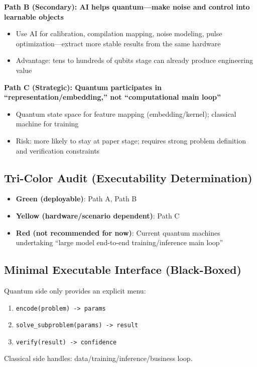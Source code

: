 \documentclass[conference]{IEEEtran}
\theoremstyle{remark}
\begin{document}
\textbf{Path B (Secondary): AI helps quantum---make noise and control into learnable objects}
\begin{itemize}[nosep]
\item Use AI for calibration, compilation mapping, noise modeling, pulse optimization---extract more stable results from the same hardware
\item Advantage: tens to hundreds of qubits stage can already produce engineering value
\end{itemize}

\textbf{Path C (Strategic): Quantum participates in ``representation/embedding,'' not ``computational main loop''}
\begin{itemize}[nosep]
\item Quantum state space for feature mapping (embedding/kernel); classical machine for training
\item Risk: more likely to stay at paper stage; requires strong problem definition and verification constraints
\end{itemize}

\subsection{Tri-Color Audit (Executability Determination)}
\begin{itemize}[nosep]
\item \textbf{Green (deployable)}: Path A, Path B
\item \textbf{Yellow (hardware/scenario dependent)}: Path C
\item \textbf{Red (not recommended for now)}: Current quantum machines undertaking ``large model end-to-end training/inference main loop''
\end{itemize}

\subsection{Minimal Executable Interface (Black-Boxed)}
Quantum side only provides an explicit menu:
\begin{enumerate}[nosep]
\item \texttt{encode(problem) -> params}
\item \texttt{solve\_subproblem(params) -> result}
\item \texttt{verify(result) -> confidence}
\end{enumerate}
Classical side handles: data/training/inference/business loop.
\end{document}
